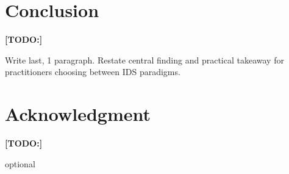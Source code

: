 \documentclass[conference]{IEEEtran}
\newenvironment{todo}
  {\par\noindent\color{red}\bfseries[TODO:]\normalfont\color{red}\begin{itshape}}
  {\end{itshape}\par\normalfont\color{black}}
\begin{document}
\section{Conclusion}
\begin{todo}
Write last, 1 paragraph. Restate central finding and practical takeaway for practitioners choosing between IDS paradigms.
\end{todo}
 
\section*{Acknowledgment}
\begin{todo}
optional
\end{todo}
 


 
\end{document}
